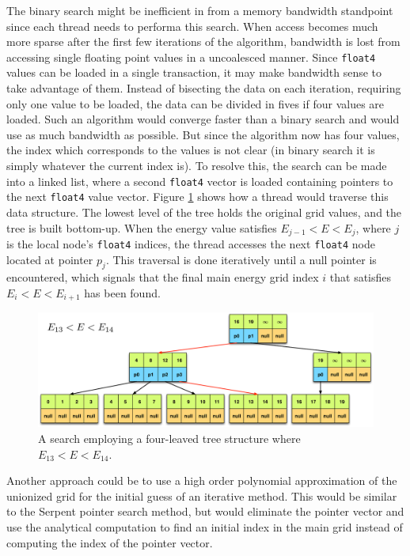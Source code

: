 The binary search might be inefficient in from a memory bandwidth standpoint since each thread needs to performa this search.  When access becomes much more sparse after the first few iterations of the algorithm, bandwidth is lost from accessing single floating point values in a uncoalesced manner.  Since \lstinline{float4} values can be loaded in a single transaction, it may make bandwidth sense to take advantage of them.  Instead of bisecting the data on each iteration, requiring only one value to be loaded, the data can be divided in fives if four values are loaded.  Such an algorithm would converge faster than a binary search and would use as much bandwidth as possible.  But since the algorithm now has four values, the index which corresponds to the values is not clear (in binary search it is simply whatever the current index is).  To resolve this, the search can be made into a linked list, where a second \lstinline{float4} vector is loaded containing pointers to the next \lstinline{float4} value vector.  Figure \ref{quad_tree} shows how a thread would traverse this data structure.  The lowest level of the tree holds the original grid values, and the tree is built bottom-up.  When the energy value satisfies $E_{j-1}<E<E_{j}$, where $j$ is the local node's \lstinline{float4} indices, the thread accesses the next \lstinline{float4} node located at pointer $p_j$.  This traversal is done iteratively until a null pointer is encountered, which signals that the final main energy grid index $i$ that satisfies $E_{i}<E<E_{i+1}$ has been found.

\begin{figure}[h!] 
\centering
\includegraphics[width=1.0\textwidth]{graphics/quad_tree.eps}
\caption{A search employing a four-leaved tree structure where $E_{13}<E<E_{14}$. \label{quad_tree} }
\end{figure}

Another approach could be to use a high order polynomial approximation of the unionized grid for the initial guess of an iterative method.  This would be similar to the Serpent pointer search method, but would eliminate the pointer vector and use the analytical computation to find an initial index in the main grid instead of computing the index of the pointer vector.

